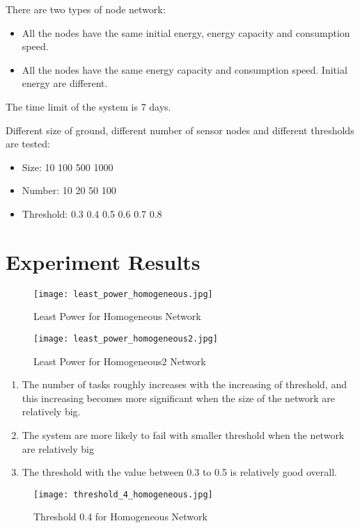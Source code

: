 \documentclass[11pt]{article}
\begin{document}
There are two types of node network:
\begin{itemize}
\item All the nodes have the same initial energy, energy capacity and consumption speed.
\item All the nodes have the same energy capacity and consumption speed. Initial energy are different.
\end{itemize}

The time limit of the system is 7 days.

Different size of ground, different number of sensor nodes and different thresholds are tested:
\begin{itemize}
\item Size: 10 100 500 1000
\item Number: 10 20 50 100
\item Threshold: 0.3 0.4 0.5 0.6 0.7 0.8
\end{itemize}

\section{Experiment Results}
\begin{figure}[ht!]
\centering
\texttt{[image: least\_power\_homogeneous.jpg]}
\caption{Least Power for Homogeneous Network}
\label{fig:least_power_homogeneous}
\end{figure}

\begin{figure}[ht!]
\centering
\texttt{[image: least\_power\_homogeneous2.jpg]}
\caption{Least Power for Homogeneous2 Network}
\label{fig:least_power_homogeneous2}
\end{figure}

\begin{enumerate}
\item The number of tasks roughly increases with the increasing of threshold, and this increasing becomes more significant when the size of the network are relatively big.
\item The system are more likely to fail with smaller threshold when the network are relatively big
\item The threshold with the value between 0.3 to 0.5 is relatively good overall.
\end{enumerate}

\begin{figure}[ht!]
\centering
\texttt{[image: threshold\_4\_homogeneous.jpg]}
\caption{Threshold 0.4 for Homogeneous Network}
\label{fig:threshold_4_homogeneous}
\end{figure}
\end{document}
